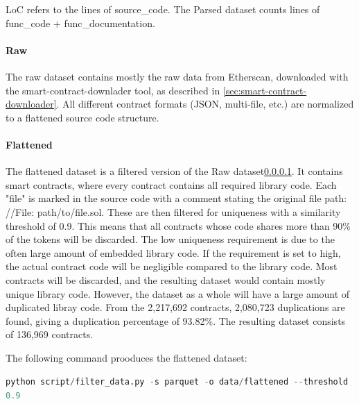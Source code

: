 LoC refers to the lines of source\_code. The Parsed dataset counts lines of func\_code + func\_documentation.

\paragraph{Raw}
\label{sec:verified-smart-contracts-raw}
The raw dataset contains mostly the raw data from Etherscan, downloaded with the smart-contract-downlader tool, as described in \cref{sec:smart-contract-downloader}. All different contract formats (JSON, multi-file, etc.) are normalized to a flattened source code structure. 


\paragraph{Flattened}
\label{sec:verified-smart-contracts-flattened}

The flattened dataset is a filtered version  of the Raw dataset\cref{sec:verified-smart-contracts-raw}. It contains smart contracts, where every contract contains all required library code. Each "file" is marked in the source code with a comment stating the original file path: //File: path/to/file.sol. These are then filtered for uniqueness with a similarity threshold of 0.9. This means that all contracts whose code shares more than 90\% of the tokens will be discarded. The low uniqueness requirement is due to the often large amount of embedded library code. If the requirement is set to high, the actual contract code will be negligible compared to the library code. Most contracts will be discarded, and the resulting dataset would contain mostly unique library code. However, the dataset as a whole will have a large amount of duplicated libray code. From the 2,217,692 contracts, 2,080,723 duplications are found, giving a duplication percentage of 93.82\%. The resulting dataset consists of 136,969 contracts.


The following command prooduces the flattened dataset:

\lstinline[language=Python]!python script/filter_data.py -s parquet -o data/flattened --threshold 0.9!


